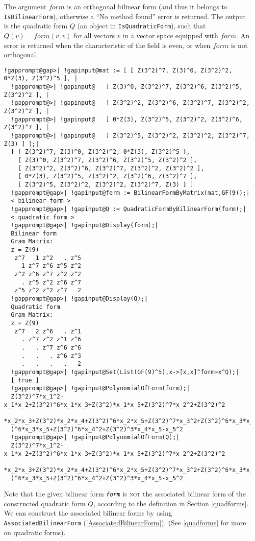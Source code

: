 \documentclass[a4paper,11pt]{report}
\begin{document}
{{{The argument $form$ is an orthogonal bilinear form (and thus it belongs to \texttt{IsBilinearForm}), otherwise a ``No method found'' error is returned. The output is the
quadratic form $Q$ (an object in \texttt{IsQuadraticForm}), such that $Q(v) = form(v,v)$ for all vectors $v$ in a vector space equipped with $form$. An error is returned when the characteristic of the field is even, or when $form$ is not orthogonal. 
\begin{Verbatim}[commandchars=!@|,fontsize=\small,frame=single,label=Example]
  !gapprompt@gap>| !gapinput@mat := [ [ Z(3^2)^7, Z(3)^0, Z(3^2)^2, 0*Z(3), Z(3^2)^5 ], |
  !gapprompt@>| !gapinput@   [ Z(3)^0, Z(3^2)^7, Z(3^2)^6, Z(3^2)^5, Z(3^2)^2 ], |
  !gapprompt@>| !gapinput@   [ Z(3^2)^2, Z(3^2)^6, Z(3^2)^7, Z(3^2)^2, Z(3^2)^2 ], |
  !gapprompt@>| !gapinput@   [ 0*Z(3), Z(3^2)^5, Z(3^2)^2, Z(3^2)^6, Z(3^2)^7 ], |
  !gapprompt@>| !gapinput@   [ Z(3^2)^5, Z(3^2)^2, Z(3^2)^2, Z(3^2)^7, Z(3) ] ];|
  [ [ Z(3^2)^7, Z(3)^0, Z(3^2)^2, 0*Z(3), Z(3^2)^5 ], 
    [ Z(3)^0, Z(3^2)^7, Z(3^2)^6, Z(3^2)^5, Z(3^2)^2 ], 
    [ Z(3^2)^2, Z(3^2)^6, Z(3^2)^7, Z(3^2)^2, Z(3^2)^2 ], 
    [ 0*Z(3), Z(3^2)^5, Z(3^2)^2, Z(3^2)^6, Z(3^2)^7 ], 
    [ Z(3^2)^5, Z(3^2)^2, Z(3^2)^2, Z(3^2)^7, Z(3) ] ]
  !gapprompt@gap>| !gapinput@form := BilinearFormByMatrix(mat,GF(9));|
  < bilinear form >
  !gapprompt@gap>| !gapinput@Q := QuadraticFormByBilinearForm(form);|
  < quadratic form >
  !gapprompt@gap>| !gapinput@Display(form);|
  Bilinear form
  Gram Matrix:
  z = Z(9)
   z^7   1 z^2   . z^5
     1 z^7 z^6 z^5 z^2
   z^2 z^6 z^7 z^2 z^2
     . z^5 z^2 z^6 z^7
   z^5 z^2 z^2 z^7   2
  !gapprompt@gap>| !gapinput@Display(Q);|
  Quadratic form
  Gram Matrix:
  z = Z(9)
   z^7   2 z^6   . z^1
     . z^7 z^2 z^1 z^6
     .   . z^7 z^6 z^6
     .   .   . z^6 z^3
     .   .   .   .   2
  !gapprompt@gap>| !gapinput@Set(List(GF(9)^5),x->[x,x]^form=x^Q);|
  [ true ]
  !gapprompt@gap>| !gapinput@PolynomialOfForm(form);|
  Z(3^2)^7*x_1^2-x_1*x_2+Z(3^2)^6*x_1*x_3+Z(3^2)*x_1*x_5+Z(3^2)^7*x_2^2+Z(3^2)^2
  *x_2*x_3+Z(3^2)*x_2*x_4+Z(3^2)^6*x_2*x_5+Z(3^2)^7*x_3^2+Z(3^2)^6*x_3*x_4+Z(3^2
  )^6*x_3*x_5+Z(3^2)^6*x_4^2+Z(3^2)^3*x_4*x_5-x_5^2
  !gapprompt@gap>| !gapinput@PolynomialOfForm(Q);|
  Z(3^2)^7*x_1^2-x_1*x_2+Z(3^2)^6*x_1*x_3+Z(3^2)*x_1*x_5+Z(3^2)^7*x_2^2+Z(3^2)^2
  *x_2*x_3+Z(3^2)*x_2*x_4+Z(3^2)^6*x_2*x_5+Z(3^2)^7*x_3^2+Z(3^2)^6*x_3*x_4+Z(3^2
  )^6*x_3*x_5+Z(3^2)^6*x_4^2+Z(3^2)^3*x_4*x_5-x_5^2 
\end{Verbatim}
 Note that the given bilinear form \mbox{\texttt{\mdseries\slshape form}} is \textsc{not} the associated bilinear form of the constructed quadratic form $Q$, according to the definition in Section \ref{quadforms}. We can construct the associated bilinear forms by using \texttt{AssociatedBilinearForm} (\ref{AssociatedBilinearForm}). (See \ref{quadforms} for more on quadratic forms). }

}}
\end{document}
